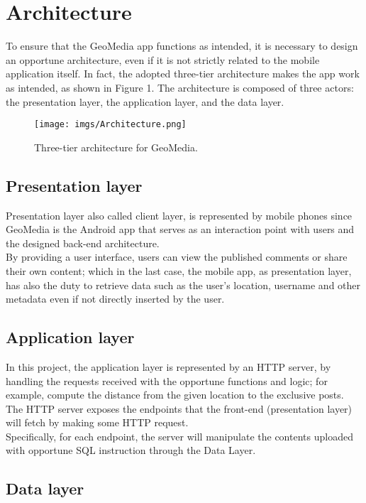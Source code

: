 \documentclass[conference]{IEEEtran}
\begin{document}
\section{Architecture}\label{Architecture:panoramic}

To ensure that the GeoMedia app functions as intended, it is necessary to design an opportune architecture, even if it is not strictly related to the mobile application itself.
In fact, the adopted three-tier architecture makes the app work as intended, as shown in Figure 1.
The architecture is composed of three actors: the presentation layer, the application layer, and the data layer.

\begin{figure}[htbp]
{\texttt{[image: imgs/Architecture.png]}}
\caption{Three-tier architecture for GeoMedia.}
\label{fig}
\end{figure}


\subsection{Presentation layer}
Presentation layer also called client layer, is represented by mobile phones since GeoMedia is the Android app that serves as an interaction point with users and the designed back-end architecture.
\\
By providing a user interface, users can view the published comments or share their own content; which in the last case, the mobile app, as presentation layer, has also the duty to retrieve data such as the user's location, username and other metadata even if not directly inserted by the user.
\subsection{Application layer}

In this project, the application layer is represented by an HTTP server, by handling the requests received with the opportune functions and logic; for example, compute the distance from the given location to the exclusive posts.
The HTTP server exposes the endpoints that the front-end (presentation layer) will fetch by making some HTTP request.
\\
Specifically, for each endpoint, the server will manipulate the contents uploaded with opportune SQL instruction through the Data Layer.

\subsection{Data layer}
\end{document}
